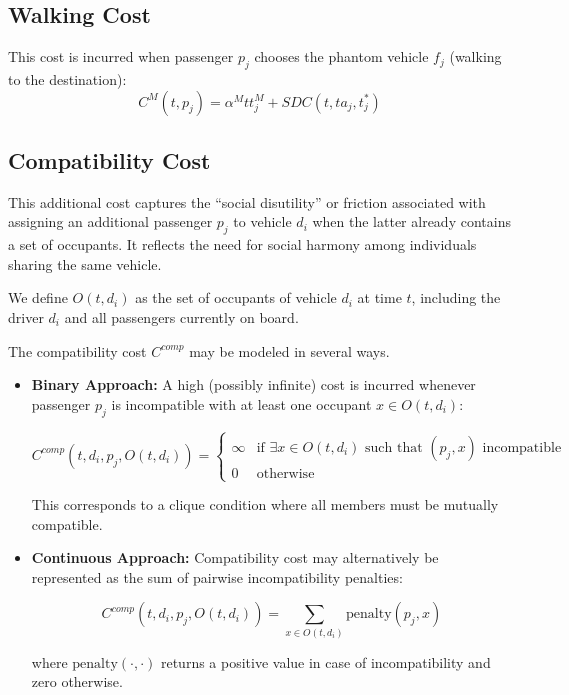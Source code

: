 \documentclass[11pt,a4paper]{article}
\begin{document}
\subsection{Walking Cost}
This cost is incurred when passenger $p_j$ chooses the phantom vehicle $f_j$ (walking to the destination):
\[ C^M(t, p_j) = \alpha^M tt^M_j + SDC(t, ta_j, t^*_j) \]

\subsection{Compatibility Cost}

This additional cost captures the ``social disutility'' or friction associated with assigning an additional passenger $p_j$ to vehicle $d_i$ when the latter already contains a set of occupants. It reflects the need for social harmony among individuals sharing the same vehicle.

We define $O(t,d_i)$ as the set of occupants of vehicle $d_i$ at time $t$, including the driver $d_i$ and all passengers currently on board.

The compatibility cost $C^{comp}$ may be modeled in several ways.

\begin{itemize}

    \item \textbf{Binary Approach:}
    A high (possibly infinite) cost is incurred whenever passenger $p_j$ is incompatible with at least one occupant $x\in O(t,d_i)$:

$$
C^{comp}(t,d_i,p_j,O(t,d_i))
=
\begin{cases}
\infty
&
\text{if }\exists x\in O(t,d_i)
\text{ such that }(p_j,x)\text{ incompatible}
\\
0
&
\text{otherwise}
\end{cases}
$$

This corresponds to a clique condition where all members must be mutually compatible.

    \item \textbf{Continuous Approach:}
    Compatibility cost may alternatively be represented as the sum of pairwise incompatibility penalties:

$$
C^{comp}(t,d_i,p_j,O(t,d_i))
=
\sum_{x\in O(t,d_i)}
\text{penalty}(p_j,x)
$$

where $\text{penalty}(\cdot,\cdot)$ returns a positive value in case of incompatibility and zero otherwise.

\end{itemize}
\end{document}
